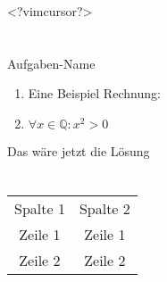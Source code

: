 ﻿\documentclass{article}
\title{\MyDocTitle{}}
\author{\MyDocAuthor{}}
\date{\MyDocDate{}}
\begin{document}
\renewcommand{\seriesname}{Aufgabe}
\setcounter{exerciseseries}{0}



\maketitle

\tableofcontents

\newpage


%
%
%       
%
%
%

<?vimcursor?>

\section{\exercisesname}
\begin{exerciseseries}{Aufgaben-Name}
	\begin{exercise}
		\begin{enumerate}[label=(\alph*)]
			\item Eine Beispiel Rechnung:
			\item \(\forall x \in \mathbb{Q} : x^2 > 0\)
		\end{enumerate}
	\end{exercise}
	\begin{solution}
		Das wäre jetzt die Lösung
	\end{solution}
\end{exerciseseries}

\section{\solutionsname}
\loadSolutions


\begin{tabular}{|c|c|}
	\hline
	Spalte 1 & Spalte 2 \\ \hlineB{3}
	Zeile 1 & Zeile 1 \\ \hline
	Zeile 2 & Zeile 2 \\
	\hline
\end{tabular}
\end{document}
